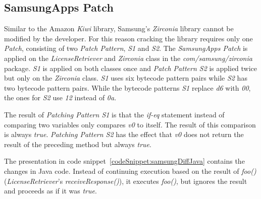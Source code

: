 \subsection{SamsungApps Patch}
Similar to the Amazon \textit{Kiwi} library, Samsung's \textit{Zirconia} library cannot be modified by the developer.
For this reason cracking the library requires only one \textit{Patch}, consisting of two \textit{Patch Pattern}, \textit{S1} and \textit{S2}.
The \textit{SamsungApps Patch} is applied on the \textit{LicenseRetriever} and \textit{Zirconia} class in the \textit{com/samsung/zirconia} package.
\textit{S1} is applied on both classes once and \textit{Patch Pattern S2} is applied twice but only on the \textit{Zirconia} class.
\newline
\textit{S1} uses six bytecode pattern pairs while \textit{S2} has two bytecode pattern pairs.
While the bytecode patterns \textit{S1} replace \textit{d6} with \textit{00}, the ones for \textit{S2} use \textit{12} instead of \textit{0a}.
\newline


The result of \textit{Patching Pattern S1} is that the \textit{if-eq} statement instead of comparing two variables only compares \textit{v0} to itself.
The result of this comparison is always \textit{true}.
\newline
\textit{Patching Pattern S2} has the effect that \textit{v0} does not return the result of the preceding method but always \textit{true}.
\newline

The presentation in code snippet~\ref{codeSnippet:samsungDiffJava} contains the changes in Java code.
Instead of continuing execution based on the result of \textit{foo()} (\textit{LicenseRetriever}'s \textit{receiveResponse()}), it executes \textit{foo()}, but ignores the result and proceeds as if it was \textit{true}.
